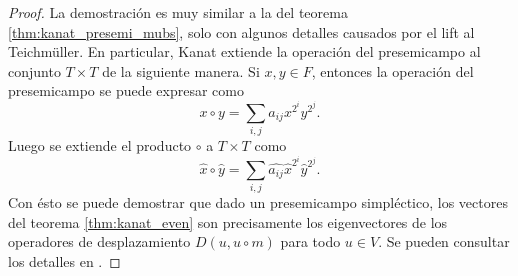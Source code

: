\documentclass[a4paper]{report}
\DeclareMathOperator{\tr}{tr}
\DeclareMathOperator{\GF}{GF}
\begin{document}
  \begin{proof}
    La demostración es muy similar a la del teorema
    \ref{thm:kanat_presemi_mubs}, solo con algunos detalles
    causados por el lift al Teichmüller. En particular,
    Kanat extiende la operación del presemicampo al conjunto
    $T \times T$ de la siguiente manera. Si $x, y \in F$,
    entonces la operación del presemicampo se puede expresar
    como
    \[
      x \circ y
      = \sum_{i,j}^{} a_{ij} x^{2^{i}} y^{2^{j}}.
    \] 
    Luego se extiende el producto $\circ$ a $T \times T$
    como
    \[
      \hat x \circ \hat y
      = \sum_{i,j}^{} \widehat{a_{ij}} \hat{x}^{2^{i}}
      \hat{y}^{2^{j}}. 
    \] 
    Con ésto se puede demostrar que dado un presemicampo
    simpléctico, los vectores del teorema
    \ref{thm:kanat_even} son precisamente los eigenvectores
    de los operadores de desplazamiento $D(u,u\circ m)$ para
    todo $u \in V$.  Se pueden consultar los detalles en
    \cite{abdukhalikov2015}.
  \end{proof}
  
\end{document}
